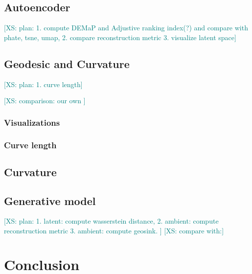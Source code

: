 \documentclass{article}
\theoremstyle{plain}
\theoremstyle{definition}
\theoremstyle{remark}
\newcommand{\xin}[1]{\textcolor{teal}{[XS: #1]}}
\begin{document}
\subsection{Autoencoder}
\xin{plan: 1. compute DEMaP and Adjustive ranking index(?) and compare with phate, tsne, umap, 2. compare reconstruction metric 3. visualize latent space}
\subsection{Geodesic and Curvature}
\xin{plan: 1. curve length}
\par\xin{comparison: our own }
\subsubsection{Visualizations}
\subsubsection{Curve length}
\subsection{Curvature}
\subsection{Generative model}
\xin{plan: 1. latent: compute wasserstein distance, 2. ambient: compute reconstruction metric 3. ambient: compute geosink. }
\xin{compare with:}

\section{Conclusion}



%

\end{document}

